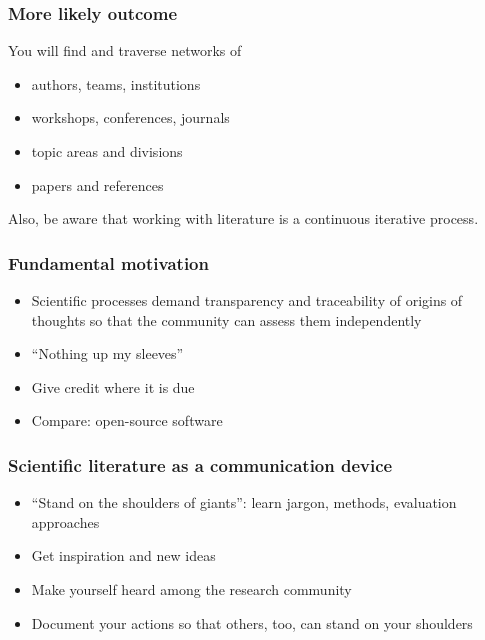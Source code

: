 \documentclass[]{beamer} %
\begin{document}
\begin{frame}
\frametitle{More likely outcome}
You \alert{will} find and \alert{traverse} networks of
\begin{itemize}
	\item authors, teams, institutions 
	\item workshops, conferences, journals
	\item topic areas and divisions
	\item papers and references
\end{itemize}
Also, be aware that working with literature is a \alert{continuous iterative process}.
\end{frame}


\begin{frame}
\frametitle{Fundamental motivation}
\begin{itemize}
	\item Scientific processes demand \alert{transparency} and \alert{traceability} of origins of thoughts so that the community can assess them independently
	\item ``Nothing up my sleeves''
	\item Give credit where it is due
	\item Compare: open-source software
\end{itemize}
\end{frame}

\begin{frame}
\frametitle{Scientific literature as a communication device}
\begin{itemize}
	\item ``Stand on the shoulders of giants'': learn jargon, methods, evaluation approaches
	\item Get inspiration and new ideas
	\item Make yourself heard among the research community
	\item Document your actions so that others, too, can stand on \alert{your} shoulders
\end{itemize}
\end{frame}
\end{document}
